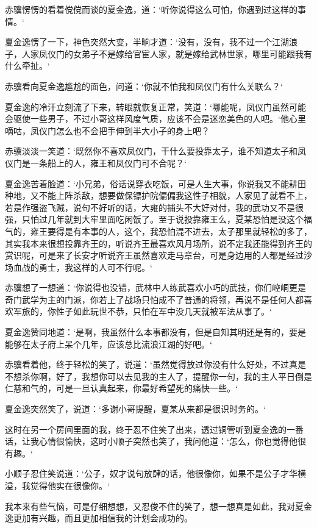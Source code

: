 赤骥愣愣的看着傥傥而谈的夏金逸，道：‘听你说得这么可怕，你遇到过这样的事情。‘

夏金逸愣了一下，神色突然大变，半晌才道：‘没有，没有，我不过一个江湖浪子，人家凤仪门的女弟子不是嫁给官宦人家，就是嫁给武林世家，哪里可能跟我有什么牵扯。‘

赤骥看向夏金逸尴尬的面色，问道：‘你就不怕我和凤仪门有什么关联么？‘

夏金逸的冷汗立刻流了下来，转眼就恢复正常，笑道：‘哪能呢，凤仪门虽然可能会驱使一些男子，不过小哥这样风度气质，应该不会是迷恋美色的人吧。‘他心里嘀咕，凤仪门怎么也不会把手伸到半大小子的身上吧？

赤骥淡淡一笑道：‘既然你不喜欢凤仪门，干什么要投靠太子，谁不知道太子和凤仪门是一条船上的人，雍王和凤仪门可不合呢？‘

夏金逸苦着脸道：‘小兄弟，俗话说穿衣吃饭，可是人生大事，你说我又不能耕田种地，又不能上阵杀敌，想要做保镖护院偏偏我这性子相貌，人家见了就看不上，若是作强盗飞贼，说句不好听的话，大雍的捕头不大好对付，我的武功又不是很强，只怕过几年就到大牢里面吃闲饭了。至于说投靠雍王么，夏某恐怕是没这个福气的，雍王要得是有本事的人，这个，我恐怕混不进去，太子那里就轻松的多了，其实我本来很想投靠齐王的，听说齐王最喜欢风月场所，说不定我还能得到齐王的赏识呢，可是来了长安才听说齐王虽然喜欢走马章台，可是身边用的人都是经过沙场血战的勇士，我这样的人可不行呢。‘

赤骥想了一想道：‘你说得也没错，武林中人练武喜欢小巧的武技，你们崆峒更是奇门武学为主的门派，你若上了战场只怕成不了普通的将领，再说不是任何人都喜欢军旅的，你性子如此玩世不恭，只怕在军中没几天就被军法从事了。‘

夏金逸赞同地道：‘是啊，我虽然什么本事都没有，但是自知其明还是有的，要是能够在太子府上呆个几年，应该总比流浪江湖的好吧。‘

赤骥看着他，终于轻松的笑了，说道：‘虽然觉得放过你没有什么好处，不过真是不想杀你啊，好了，我想你可以去见我的主人了，提醒你一句，我的主人平日倒是仁慈和气的，可是一旦认真起来，你最好希望死的痛快一些。‘

夏金逸突然笑了，说道：‘多谢小哥提醒，夏某从来都是很识时务的。‘

这时在另一个房间里面的我，终于忍不住笑了出来，透过铜管听到夏金逸的一番话，让我心情很愉快，这时小顺子突然也笑了，我问他道：‘怎么，你也觉得他很有趣。‘

小顺子忍住笑说道：‘公子，奴才说句放肆的话，他很像你，如果不是公子才华横溢，我觉得他实在很像你。‘

我本来有些气恼，可是仔细想想，又忍俊不住的笑了，想一想真是如此，我对夏金逸更加有兴趣，而且更加相信我的计划会成功的。

